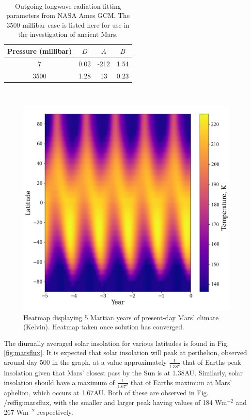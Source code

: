 \documentclass[12pt,onecolumn]{revtex4-2}    %
\begin{document}
\

\begin{table}
\begin{tabular}{cccc} \toprule
    Pressure (millibar) & $D$ & $A$ & $B$ \\ \midrule
    7  & 0.02 & -212 & 1.54 \\
    3500 & 1.28 & 13 & 0.23 \\
\bottomrule
\end{tabular}
\caption{Outgoing longwave radiation fitting parameters from NASA Ames GCM. The 3500 millibar case is listed here for use in the investigation of ancient Mars.}
\label{table:GCMparams}
\end{table}

\

\begin{figure}[h]
\centering
\includegraphics[width = 14cm]{Mars5yrsHeatmapNew.png}
\caption{Heatmap displaying 5 Martian years of present-day Mars' climate (Kelvin). Heatmap taken once solution has converged.}
\label{fig:modernmarsheatmap}
\end{figure}

The diurnally averaged solar insolation for various latitudes is found in Fig. \ref{fig:marsflux}. It is expected that solar insolation will peak at perihelion, observed around day 500 in the graph, at a value approximately $\frac{1}{1.38^{2}}$ that of Earths peak insolation given that Mars' closest pass by the Sun is at 1.38AU. Similarly, solar insolation should have a maximum of $\frac{1}{1.67^{2}}$ that of Earths maximum at Mars' aphelion, which occurs at 1.67AU. Both of these are observed in Fig. /ref{fig:marsflux}, with the smaller and larger peak having values of 184 Wm$^{-2}$ and 267 Wm$^{-2}$ respectively. 
\end{document}
